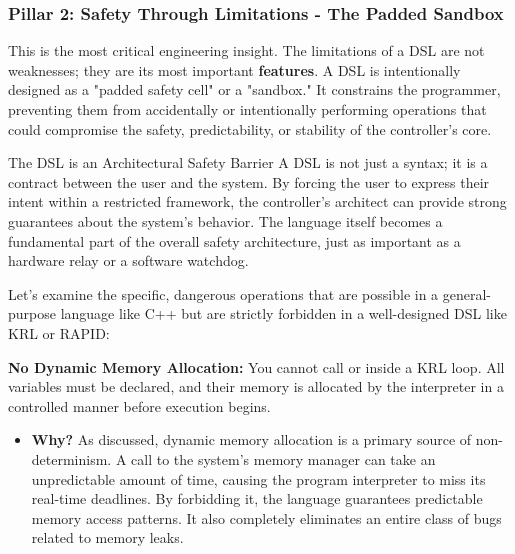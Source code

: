
\subsubsection{Pillar 2: Safety Through Limitations - The Padded Sandbox}
\label{subsubsec:dsl_safety}

This is the most critical engineering insight. The limitations of a DSL are not weaknesses; they are its most important \textbf{features}. A DSL is intentionally designed as a "padded safety cell" or a "sandbox." It constrains the programmer, preventing them from accidentally or intentionally performing operations that could compromise the safety, predictability, or stability of the controller's core.

\begin{principlebox}{The DSL is an Architectural Safety Barrier}
    A DSL is not just a syntax; it is a contract between the user and the system. By forcing the user to express their intent within a restricted framework, the controller's architect can provide strong guarantees about the system's behavior. The language itself becomes a fundamental part of the overall safety architecture, just as important as a hardware relay or a software watchdog.
\end{principlebox}

Let's examine the specific, dangerous operations that are possible in a general-purpose language like C++ but are strictly forbidden in a well-designed DSL like KRL or RAPID:

 \textbf{No Dynamic Memory Allocation:} You cannot call  or  inside a KRL loop. All variables must be declared, and their memory is allocated by the interpreter in a controlled manner before execution begins.
    \begin{itemize}
        \item \textbf{Why?} As discussed, dynamic memory allocation is a primary source of non-determinism. A call to the system's memory manager can take an unpredictable amount of time, causing the program interpreter to miss its real-time deadlines. By forbidding it, the language guarantees predictable memory access patterns. It also completely eliminates an entire class of bugs related to memory leaks.
    \end{itemize}

